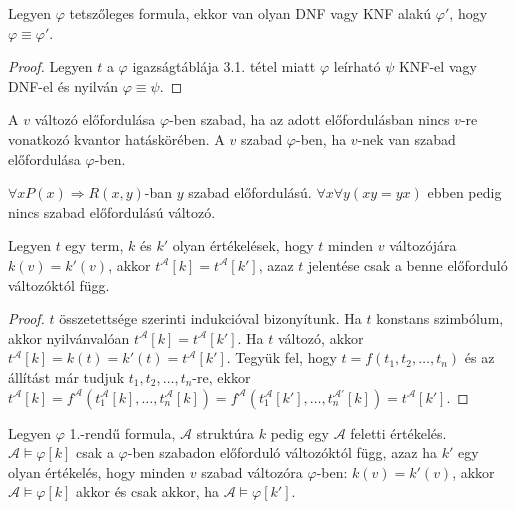 \begin{state}Legyen $\varphi$ tetszőleges formula, ekkor van olyan DNF vagy KNF alakú $\varphi'$, hogy $\varphi \equiv \varphi'$.
\end{state}
\begin{proof} Legyen $t$ a $\varphi$ igazságtáblája 3.1. tétel miatt $\varphi$ leírható $\psi$ KNF-el vagy DNF-el és nyilván $\varphi \equiv \psi$.
\end{proof}
\begin{defi} A $v$ változó előfordulása $\varphi$-ben szabad, ha az adott előfordulásban nincs $v$-re vonatkozó kvantor hatáskörében. A $v$ szabad $\varphi$-ben, ha $v$-nek van szabad előfordulása $\varphi$-ben.
\end{defi}
\begin{exmpl} $\forall x P(x) \Rightarrow R(x,y)$-ban $y$ szabad előfordulású.  $\forall x \forall y (xy = yx)$ ebben pedig nincs szabad előfordulású változó.
\end{exmpl}
\begin{state} Legyen $t$ egy term, $k$ és $k'$ olyan értékelések, hogy $t$ minden $v$ változójára $k(v) = k'(v)$, akkor $t^\mathcal{A}[k] = t^{\mathcal{A}}[k']$, azaz $t$ jelentése csak a benne előforduló változóktól függ.
\end{state}
\begin{proof}$t$ összetettsége szerinti indukcióval bizonyítunk. 
Ha $t$ konstans szimbólum, akkor nyilvánvalóan $t^\mathcal{A}[k] = t^{\mathcal{A}}[k']$. Ha $t$ változó, akkor $t^\mathcal{A}[k] = k(t) = k'(t) = t^{\mathcal{A}}[k']$. Tegyük fel, hogy $t = f(t_1,t_2,\ldots,t_{n})$ és az állítást már tudjuk $t_1,t_2,\ldots,t_{n}$-re, ekkor $t^\mathcal{A}[k] = f^\mathcal{A}(t^\mathcal{A}_1[k],\ldots,t^\mathcal{A}_n[k]) = f^\mathcal{A}(t^\mathcal{A}_1[k'],\ldots,t^\mathcal{A'}_n[k]) = t^\mathcal{A}[k']$.
\end{proof}
\begin{theo} Legyen $\varphi$ 1.-rendű formula, $\mathcal{A}$ struktúra $k$ pedig egy $\mathcal{A}$ feletti értékelés. $\mathcal{A} \models \varphi[k]$ csak a $\varphi$-ben szabadon előforduló változóktól függ, azaz ha $k'$ egy olyan értékelés, hogy minden $v$ szabad változóra $\varphi$-ben: $k(v)=k'(v)$, akkor $\mathcal{A} \models \varphi[k]$ akkor és csak akkor, ha $\mathcal{A} \models \varphi[k']$.
\end{theo}
